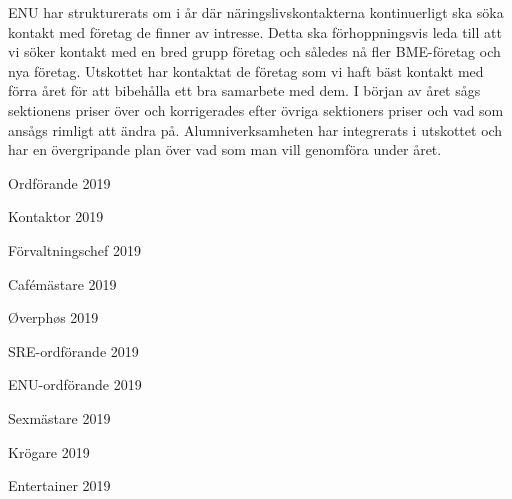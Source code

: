 \documentclass[../_main/handlingar.tex]{subfiles}
\begin{document}
ENU har strukturerats om i år där näringslivskontakterna kontinuerligt ska söka kontakt med företag de finner av intresse. Detta ska förhoppningsvis leda till att vi söker kontakt med en bred grupp företag och således nå fler BME-företag och nya företag. Utskottet har kontaktat de företag som vi haft bäst kontakt med förra året för att bibehålla ett bra samarbete med dem. I början av året sågs sektionens priser över och korrigerades efter övriga sektioners priser och vad som ansågs rimligt att ändra på. Alumniverksamheten har integrerats i utskottet och har en övergripande plan över vad som man vill genomföra under året.


\newpage
\begin{signatures}{10}
    \mvh
    \signature{\ordf}{Ordförande 2019}
    \signature{\sekr}{Kontaktor 2019}
    \signature{\fvc}{Förvaltningschef 2019}
    \signature{\cafem}{Cafémästare 2019}
    \signature{\ophos}{Øverphøs 2019}
    \signature{\sreordf}{SRE-ordförande 2019}
    \signature{\enuordf}{ENU-ordförande 2019}
    \signature{\sexm}{Sexmästare 2019}
    \signature{\krog}{Krögare 2019}
    \signature{\ent}{Entertainer 2019}
\end{signatures}
\end{document}
